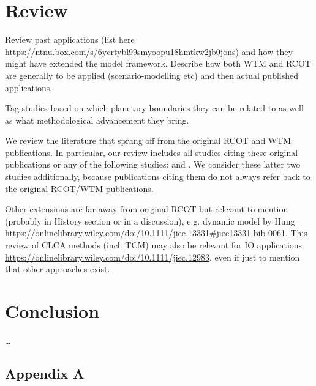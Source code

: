 \documentclass{article}
\begin{document}
\begin{refsection}
\section{Review}

Review past applications (list here \url{https://ntnu.box.com/s/6ycrtybl99smyoopu18hmtkw2jb0jons}) and how they might have extended the model framework. Describe how both WTM and RCOT are generally to be applied (scenario-modelling etc) and then actual published applications.

Tag studies based on which planetary boundaries they can be related to as well as what methodological advancement they bring.

We review the literature that sprang off from the original RCOT and WTM publications. In particular, our review includes all studies citing these original publications or any of the following studies: \textcite{stromman_2006} and \textcite{kätelhön_2016}. We consider these latter two studies additionally, because publications citing them do not always refer back to the original RCOT/WTM publications.

Other extensions are far away from original RCOT but relevant to mention (probably in History section or in a discussion), e.g. dynamic model by Hung \url{https://onlinelibrary.wiley.com/doi/10.1111/jiec.13331#jiec13331-bib-0061}. This review of CLCA methods (incl. TCM) may also be relevant for IO applications \url{https://onlinelibrary.wiley.com/doi/10.1111/jiec.12983}, even if just to mention that other approaches exist.

\section{Conclusion}

\dots


\newrefcontext[sorting=nyt] %
\printbibliography[heading = bibintoc] %

\end{refsection}

\newpage
\setcounter{page}{1}
\renewcommand{\thepage}{A-\arabic{page}}
\linenumbers*
\addappendix

\renewcommand{\thetable}{A.\arabic{table}}
\setcounter{table}{0}
\renewcommand{\theequation}{A.\arabic{equation}}
\setcounter{equation}{0}

\begin{refsection}
\section*{Appendix A}
\lipsum[1-2]

\nolinenumbers
\newpage
\newrefcontext[sorting=nyt] %
\printbibliography[title = References in appendix]

\end{refsection}
\end{document}
